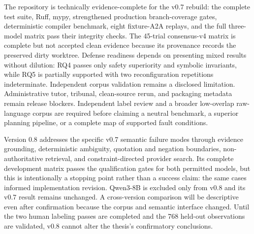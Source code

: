 \enlargethispage{2\baselineskip}
The repository is technically evidence-complete for the v0.7 rebuild: the complete test suite, Ruff, mypy, strengthened production branch-coverage gates, deterministic compiler benchmark, eight fixture-A2A replays, and the full three-model matrix pass their integrity checks. The 45-trial consensus-v4 matrix is complete but not accepted clean evidence because its provenance records the preserved dirty worktree. Defense readiness depends on presenting mixed results without dilution: RQ4 passes only safety superiority and symbolic invariants, while RQ5 is partially supported with two reconfiguration repetitions indeterminate. Independent corpus validation remains a disclosed limitation. Administrative tutor, tribunal, clean-source rerun, and packaging metadata remain release blockers. Independent label review and a broader low-overlap raw-language corpus are required before claiming a neutral benchmark, a superior planning pipeline, or a complete map of supported fault conditions.

Version 0.8 addresses the specific v0.7 semantic failure modes through evidence grounding, deterministic ambiguity, quotation and negation boundaries, non-authoritative retrieval, and constraint-directed provider search. Its complete development matrix passes the qualification gates for both permitted models, but this is intentionally a stopping point rather than a success claim: the same cases informed implementation revision. Qwen3-8B is excluded only from v0.8 and its v0.7 result remains unchanged. A cross-version comparison will be descriptive even after confirmation because the corpus and semantic interface changed. Until the two human labeling passes are completed and the 768 held-out observations are validated, v0.8 cannot alter the thesis's confirmatory conclusions.
